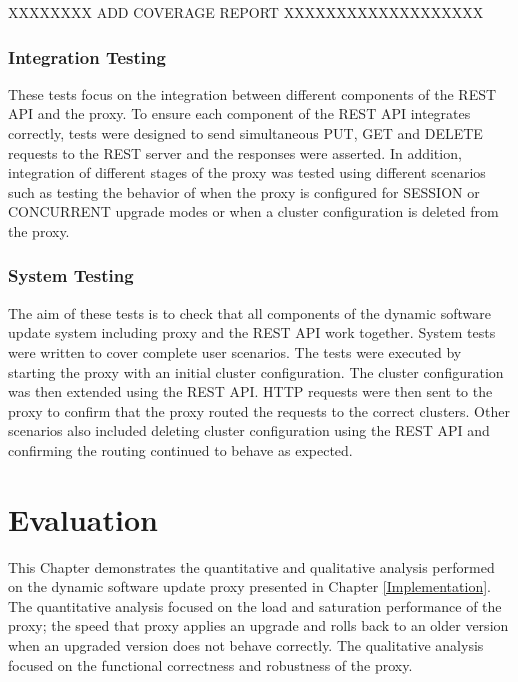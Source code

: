 \documentclass[a4paper,11pt,twoside]{report}
\begin{document}
XXXXXXXX ADD COVERAGE REPORT XXXXXXXXXXXXXXXXXXX\bigskip

\subsection{Integration Testing}
These tests focus on the integration between different components of the REST API and the proxy. To ensure each component of the REST API integrates correctly, tests were designed to send simultaneous PUT, GET and DELETE requests to the REST server and the responses were asserted. In addition, integration of different stages of the proxy was tested using different scenarios such as testing the behavior of when the proxy is configured for SESSION or CONCURRENT upgrade modes or when a cluster configuration is deleted from the proxy.

\subsection{System Testing}
The aim of these tests is to check that all components of the dynamic software update system including proxy and the REST API work together. System tests were written to cover complete user scenarios. The tests were executed by starting the proxy with an initial cluster configuration. The cluster configuration was then extended using the REST API.  HTTP requests were then sent to the proxy to confirm that the proxy routed the requests to the correct clusters.  Other scenarios also included deleting cluster configuration using the REST API and confirming the routing continued to behave as expected.

\clearpage

\chapter{Evaluation}
This Chapter demonstrates the quantitative and qualitative analysis performed on the dynamic software update proxy presented in Chapter \ref{Implementation}. The quantitative analysis focused on the load and saturation performance of the proxy; the speed that proxy applies an upgrade and rolls back to an older version when an upgraded version does not behave correctly. The qualitative analysis focused on the functional correctness and robustness of the proxy. 
\end{document}
